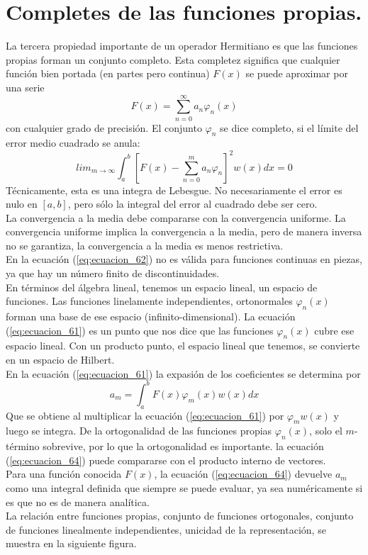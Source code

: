 \section{Completes de las funciones propias.}
La tercera propiedad importante de un operador Hermitiano es que las funciones propias forman un conjunto completo. Esta completez significa que cualquier función bien portada (en partes pero continua) $F(x)$ se puede aproximar por una serie
\begin{equation}
F(x) = \sum_{n=0}^{\infty} a_{n} \varphi_{n}(x) \label{eq:ecuacion_61}
\end{equation}
con cualquier grado de precisión. El conjunto $\varphi_{n}$ se dice completo, si el límite del error medio cuadrado se anula:
\begin{equation}
lim_{m \to \infty} \int_{a}^{b} \left[ F(x) - \sum_{n=0}^{m} a_{n} \varphi_{n} \right]^{2} w(x) dx = 0
\label{eq:ecuacion_62}
\end{equation}
Técnicamente, esta es una integra de Lebesgue. No necesariamente el error es nulo en $[a,b]$, pero sólo la integral del error al cuadrado debe ser cero.
\\
La convergencia a la media debe compararse con la convergencia uniforme. La convergencia uniforme implica la convergencia a la media, pero de manera inversa no se garantiza, la convergencia a la media es menos restrictiva.
\\
En la ecuación (\ref{eq:ecuacion_62}) no es válida para funciones continuas en piezas, ya que hay un número finito de discontinuidades.
\\
En términos del álgebra lineal, tenemos un espacio lineal, un espacio de funciones. Las funciones linelamente independientes, ortonormales $\varphi_{n}(x)$ forman una base de ese espacio (infinito-dimensional). La ecuación (\ref{eq:ecuacion_61}) es un punto que nos dice que las funciones $\varphi_{n}(x)$ cubre ese espacio lineal. Con un producto punto, el espacio lineal que tenemos, se convierte en un espacio de Hilbert.
\\
En la ecuación (\ref{eq:ecuacion_61}) la expasión de los coeficientes se determina por
\begin{equation}
a_{m} = \int_{a}^{b} F(x) \varphi_{m}(x) w(x) dx \label{eq:ecuacion_64}
\end{equation}
Que se obtiene al multiplicar la ecuación (\ref{eq:ecuacion_61}) por $\varphi_{m} w(x)$ y luego se integra. De la ortogonalidad de las funciones propias $\varphi_{n}(x)$, solo el $m$-término sobrevive, por lo que la ortogonalidad es importante. la ecuación (\ref{eq:ecuacion_64}) puede compararse con el producto interno de vectores.
\\
Para una función conocida $F(x)$,  la ecuación (\ref{eq:ecuacion_64}) devuelve $a_{m}$ como una integral definida que siempre se puede evaluar, ya sea numéricamente si es que no es de manera analítica.
\\
La relación entre funciones propias, conjunto de funciones ortogonales, conjunto de funciones linealmente independientes, unicidad de la representación, se muestra en la siguiente figura.
